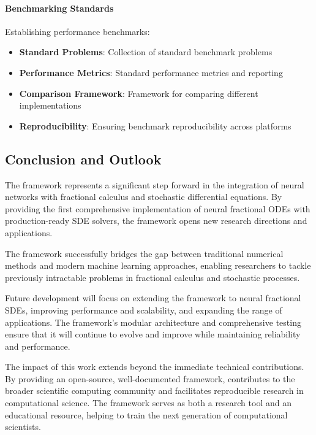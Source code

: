 \paragraph{Benchmarking Standards}
Establishing performance benchmarks:

\begin{itemize}
    \item \textbf{Standard Problems}: Collection of standard benchmark problems
    \item \textbf{Performance Metrics}: Standard performance metrics and reporting
    \item \textbf{Comparison Framework}: Framework for comparing different implementations
    \item \textbf{Reproducibility}: Ensuring benchmark reproducibility across platforms
\end{itemize}

\subsection{Conclusion and Outlook}

The \hpfracc framework represents a significant step forward in the integration of neural networks with fractional calculus and stochastic differential equations. By providing the first comprehensive implementation of neural fractional ODEs with production-ready SDE solvers, the framework opens new research directions and applications.

The framework successfully bridges the gap between traditional numerical methods and modern machine learning approaches, enabling researchers to tackle previously intractable problems in fractional calculus and stochastic processes.

Future development will focus on extending the framework to neural fractional SDEs, improving performance and scalability, and expanding the range of applications. The framework's modular architecture and comprehensive testing ensure that it will continue to evolve and improve while maintaining reliability and performance.

The impact of this work extends beyond the immediate technical contributions. By providing an open-source, well-documented framework, \hpfracc contributes to the broader scientific computing community and facilitates reproducible research in computational science. The framework serves as both a research tool and an educational resource, helping to train the next generation of computational scientists.

